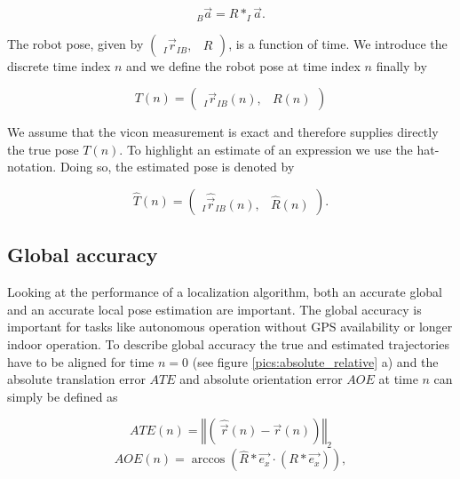 \begin{equation}
	_B \vec{a} = R * _I \vec{a} .
\end{equation}


The robot pose, given by $ \left( \begin{array}{cc} _I \vec{r}_{IB}, & R \end{array} \right) $, is a function of time. We introduce the discrete time index $n$ and we define the robot pose at time index $n$ finally by 

\begin{equation}
	T(n) = \left( \begin{array}{cc} _I \vec{r}_{IB}(n), & R(n) \end{array} \right)
\end{equation}

We assume that the vicon measurement is exact and therefore supplies directly the true pose $T(n)$. To highlight an estimate of an expression we use the hat-notation. Doing so, the estimated pose is denoted by

\begin{equation}
	\hat{T}(n) = \left( \begin{array}{cc} _I \hat{\vec{r}}_{IB}(n), & \hat{R}(n) \end{array} \right) .
\end{equation}


\subsection{Global accuracy}
\label{sec:global}

Looking at the performance of a localization algorithm, both an accurate global and an accurate local pose estimation are important. The global accuracy is important for tasks like autonomous operation without GPS availability or longer indoor operation. To describe global accuracy the true and estimated trajectories have to be aligned for time $n=0$ (see figure \ref{pics:absolute_relative} a) and the absolute translation error $ATE$ and absolute orientation error $AOE$ at time $n$ can simply be defined as

\begin{equation}
       ATE \left( n \right) = \left\Vert\left(\ \hat{\vec{r}} \left( n \right) - \vec{r} \left( n \right) \right) \right\Vert_2
\end{equation}
\begin{equation}
       AOE \left( n \right) = \arccos \left( \hat{R} *\vec{e_{x}} \cdot\left( R *\vec{e_{x}} \right)\right) ,
\end{equation}

